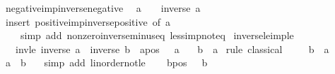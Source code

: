 \begin{isabellebody}
\isadelimproof
\isanewline
%
\endisadelimproof
\isanewline
{}\isamarkupfalse%
\ negative{\isacharunderscore}{\kern0pt}imp{\isacharunderscore}{\kern0pt}inverse{\isacharunderscore}{\kern0pt}negative{\isacharcolon}{\kern0pt}\isanewline
\ \ {\isachardoublequoteopen}a\ {\isacharless}{\kern0pt}\ {}\ {\isasymLongrightarrow}\ inverse\ a\ {\isacharless}{\kern0pt}\ {}{\isachardoublequoteclose}\isanewline
%
\isadelimproof
\ \ %
\endisadelimproof
%
\isatagproof
{}\isamarkupfalse%
\ {\isacharparenleft}{\kern0pt}insert\ positive{\isacharunderscore}{\kern0pt}imp{\isacharunderscore}{\kern0pt}inverse{\isacharunderscore}{\kern0pt}positive\ {\isacharbrackleft}{\kern0pt}of\ {\isachardoublequoteopen}{\isacharminus}{\kern0pt}a{\isachardoublequoteclose}{\isacharbrackright}{\kern0pt}{\isacharcomma}{\kern0pt}\isanewline
\ \ \ \ simp\ add{\isacharcolon}{\kern0pt}\ nonzero{\isacharunderscore}{\kern0pt}inverse{\isacharunderscore}{\kern0pt}minus{\isacharunderscore}{\kern0pt}eq\ less{\isacharunderscore}{\kern0pt}imp{\isacharunderscore}{\kern0pt}not{\isacharunderscore}{\kern0pt}eq{\isacharparenright}{\kern0pt}%
\endisatagproof
{\isafoldproof}%
%
\isadelimproof
\isanewline
%
\endisadelimproof
\isanewline
{}\isamarkupfalse%
\ inverse{\isacharunderscore}{\kern0pt}le{\isacharunderscore}{\kern0pt}imp{\isacharunderscore}{\kern0pt}le{\isacharcolon}{\kern0pt}\isanewline
\ \ \ invle{\isacharcolon}{\kern0pt}\ {\isachardoublequoteopen}inverse\ a\ {\isasymle}\ inverse\ b{\isachardoublequoteclose}\ \ apos{\isacharcolon}{\kern0pt}\ {\isachardoublequoteopen}{}\ {\isacharless}{\kern0pt}\ a{\isachardoublequoteclose}\isanewline
\ \ \ {\isachardoublequoteopen}b\ {\isasymle}\ a{\isachardoublequoteclose}\isanewline
%
\isadelimproof
%
\endisadelimproof
%
\isatagproof
{}\isamarkupfalse%
\ {\isacharparenleft}{\kern0pt}rule\ classical{\isacharparenright}{\kern0pt}\isanewline
\ \ \isamarkupfalse%
\ {\isachardoublequoteopen}{\isasymnot}\ b\ {\isasymle}\ a{\isachardoublequoteclose}\isanewline
\ \ \isamarkupfalse%
\ {\isachardoublequoteopen}a\ {\isacharless}{\kern0pt}\ b{\isachardoublequoteclose}\ \ \isamarkupfalse%
\ {\isacharparenleft}{\kern0pt}simp\ add{\isacharcolon}{\kern0pt}\ linorder{\isacharunderscore}{\kern0pt}not{\isacharunderscore}{\kern0pt}le{\isacharparenright}{\kern0pt}\isanewline
\ \ \isamarkupfalse%
\ bpos{\isacharcolon}{\kern0pt}\ {\isachardoublequoteopen}{}\ {\isacharless}{\kern0pt}\ b{\isachardoublequoteclose}\ \ \isamarkupfalse%

\end{isabellebody}
